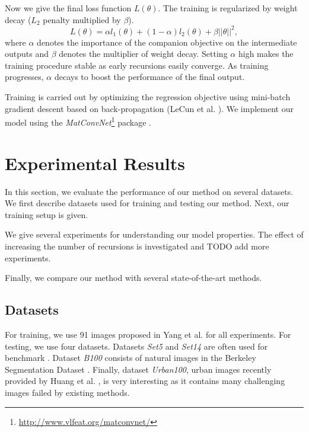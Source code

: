 \documentclass[10pt,twocolumn,letterpaper]{article}
\begin{document}
Now we give the final loss function $L(\theta)$. The training is regularized by weight decay ($L_2$ penalty multiplied by $\beta$). 
\begin{equation}
L(\theta)  =\alpha  l_1(\theta) + (1 - \alpha) l_2(\theta) + \beta ||\theta||^2,
\end{equation}
where $\alpha$ denotes the importance of the companion objective on the intermediate outputs and $\beta$ denotes the multiplier of weight decay.   Setting $\alpha$ high makes the training procedure stable as early recursions easily converge. As training progresses, $\alpha$ decays to boost the performance of the final output. 

Training is carried out by optimizing the regression objective using mini-batch gradient descent based on back-propagation (LeCun et al. \cite{lecun1998gradient}). We implement our model using the \textit{MatConvNet}\footnote{\url{ http://www.vlfeat.org/matconvnet/}} package \cite{arXiv:1412.4564}. 


\section{Experimental Results}
In this section, we evaluate the performance of our method on several datasets. We first describe datasets used for training and testing our method. Next, our training setup is given. 

We give several experiments for understanding our model properties. The effect of increasing the number of recursions is investigated and TODO add more experiments.  

Finally, we compare our method with several state-of-the-art methods. 

\subsection{Datasets}
For training, we use 91 images proposed in Yang et al. \cite{yang2010image} for all experiments. For testing, we use four datasets. Datasets \textit{Set5} \cite{bevilacqua2012} and \textit{Set14} \cite{zeyde2012single} are often used for benchmark \cite{Timofte,Timofte2013,dong2014image}. Dataset \textit{B100}  consists of natural images in the Berkeley Segmentation Dataset \cite{Martin2001}. Finally, dataset \textit{Urban100}, urban images recently provided by Huang et al. \cite{Huang-CVPR-2015}, is very interesting as it contains many challenging images failed by existing methods.
\end{document}
